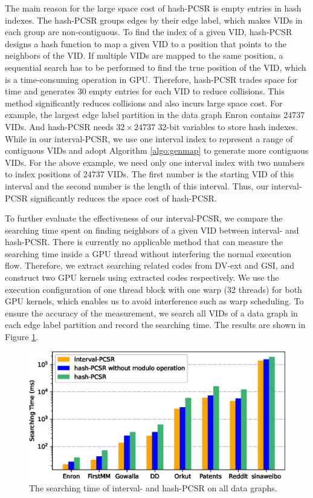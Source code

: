The main reason for the large space cost of hash-PCSR is empty entries in hash indexes. The hash-PCSR groups edges by their edge label, which makes VIDs in each group are non-contiguous. To find the index of a given VID, hash-PCSR designs a hash function to map a given VID to a position that points to the neighbors of the VID. If multiple VIDs are mapped to the same position, a sequential search has to be performed to find the true position of the VID, which is a time-consuming operation in GPU. Therefore, hash-PCSR trades space for time and generates 30 empty entries for each VID to reduce collisions. This method significantly reduces collisions and also incurs large space cost. For example, the largest edge label partition in the data graph Enron contains 24737 VIDs. And hash-PCSR needs $32 \times 24737$ 32-bit variables to store hash indexes. While in our interval-PCSR, we use one interval index to represent a range of contiguous VIDs and adopt Algorithm \ref{algo:genmap} to generate more contiguous VIDs. For the above example, we need only one interval index with two numbers to index positions of 24737 VIDs. The first number is the starting VID of this interval and the second number is the length of this interval. Thus, our interval-PCSR significantly reduces the space cost of hash-PCSR.

To further evaluate the effectiveness of our interval-PCSR, we compare the searching time spent on finding neighbors of a given VID between interval- and hash-PCSR. There is currently no applicable method that can measure the searching time inside a GPU thread without interfering the normal execution flow. Therefore, we extract searching related codes from DV-ext and GSI, and construct two GPU kernels using extracted codes respectively. We use the execution configuration of one thread block with one warp (32 threads) for both GPU kernels, which enables us to avoid interference such as warp scheduling. To ensure the accuracy of the measurement, we search all VIDs of a data graph in each edge label partition and record the searching time. The results are shown in Figure \ref{fig:searchtime}.
\begin{figure}
\centering
\includegraphics[width=\columnwidth]{./figure/accesstime.eps}
\caption{The searching time of interval- and hash-PCSR on all data graphs.}	
\label{fig:searchtime}
\end{figure}

